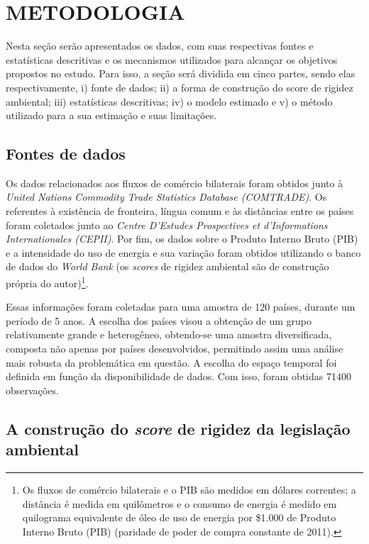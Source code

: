 \documentclass[12pt,
               openright,
               oneside,
               a4paper,
							 section=TITLE,     %
               subsection=Title,  %
               english,brazil]{article}
\begin{document}
\section{METODOLOGIA}

Nesta seção serão apresentados os dados, com suas respectivas fontes e estatísticas descritivas e os mecanismos utilizados para alcançar os objetivos propostos no estudo. Para isso, a seção será dividida em cinco partes, sendo elas respectivamente, i) fonte de dados; ii) a forma de construção do score de rigidez ambiental; iii) estatísticas descritivas; iv) o modelo estimado e v) o método utilizado para a sua estimação e suas limitações.

\subsection{Fontes de dados}

Os dados relacionados aos fluxos de comércio bilaterais  foram obtidos junto à \textit{United Nations Commodity Trade Statistics Database (COMTRADE)}. Os referentes à existência de fronteira, língua comum e às distâncias entre os países foram coletados junto ao \textit{Centre D’Estudes Prospectives et d’Informations Internationales (CEPII)}. Por fim, os dados sobre o Produto Interno Bruto (PIB) e a intensidade do uso de energia e sua variação foram obtidos utilizando o banco de dados do \textit{World Bank} (os \textit{scores} de rigidez ambiental são de construção própria do autor)\footnote{Os fluxos de comércio bilaterais e o PIB são medidos em dólares correntes; a distância é medida em quilômetros e o consumo de energia é medido em quilograma equivalente de óleo de uso de energia por \$1.000 de Produto Interno Bruto (PIB) (paridade de poder de compra constante de 2011).}.

Essas informações foram coletadas para uma amostra de 120 países, durante um período de 5 anos. A escolha dos países visou a obtenção de um grupo relativamente grande e heterogêneo, obtendo-se uma amostra diversificada, composta não apenas por países desenvolvidos, permitindo assim uma análise mais robusta da problemática em questão. A escolha do espaço temporal foi definida em função da disponibilidade de dados. Com isso, foram obtidas 71400 observações. 

\subsection{A construção do \textit{score} de rigidez da legislação ambiental}
\end{document}
